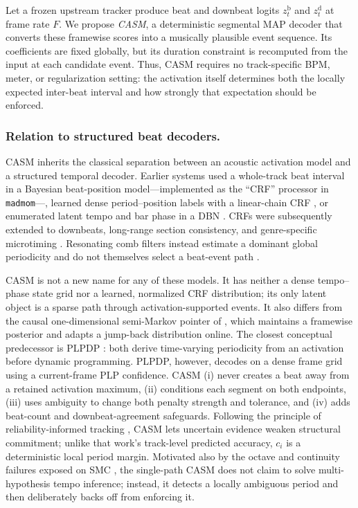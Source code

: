 \documentclass{article}
\begin{document}
Let a frozen upstream tracker produce beat and downbeat logits
$z_t^{\mathrm b}$ and $z_t^{\mathrm d}$ at frame rate $F$.  We propose
\emph{CASM}, a deterministic segmental MAP decoder that converts these
framewise scores into a musically plausible event sequence.  Its coefficients
are fixed globally, but its duration constraint is recomputed from the input at
each candidate event.  Thus, CASM requires no track-specific BPM, meter, or
regularization setting: the activation itself determines both the locally
expected inter-beat interval and how strongly that expectation should be
enforced.

\subsubsection{Relation to structured beat decoders.}
CASM inherits the classical separation between an acoustic activation model and
a structured temporal decoder.  Earlier systems used a whole-track beat
interval in a Bayesian beat-position model---implemented as the ``CRF''
processor in \texttt{madmom}---\cite{korzeniowski2014crf}, learned dense
period--position labels with a linear-chain CRF \cite{fillon2015crf}, or
enumerated latent tempo and bar phase in a DBN \cite{krebs2015dbn}.  CRFs were
subsequently extended to downbeats, long-range section consistency, and
genre-specific microtiming \cite{durand2016crfdownbeat,
fuentes2019skipchain,fuentes2019microtiming}.  Resonating comb filters instead
estimate a dominant global periodicity and do not themselves select a beat-event
path \cite{bock2015combfilter}.

CASM is not a new name for any of these models.  It has neither a dense
tempo--phase state grid nor a learned, normalized CRF distribution; its only
latent object is a sparse path through activation-supported events.  It also
differs from the causal one-dimensional semi-Markov pointer of
\cite{heydari2022semimarkov}, which maintains a framewise posterior and adapts a
jump-back distribution online.  The closest conceptual predecessor is PLPDP
\cite{chiu2023localperiodicity}: both derive time-varying periodicity from an
activation before dynamic programming.  PLPDP, however, decodes on a dense
frame grid using a current-frame PLP confidence.  CASM (i) never creates a beat
away from a retained activation maximum, (ii) conditions each segment on both
endpoints, (iii) uses ambiguity to change both penalty strength and tolerance,
and (iv) adds beat-count and downbeat-agreement safeguards.  Following the
principle of reliability-informed tracking \cite{degara2012reliability}, CASM
lets uncertain evidence weaken structural commitment; unlike that work's
track-level predicted accuracy, $c_i$ is a deterministic local period margin.
Motivated also by the octave and continuity failures exposed on SMC
\cite{ahn2026smcblindspot}, the
single-path CASM does not claim to solve multi-hypothesis tempo inference;
instead, it detects a locally ambiguous period and then deliberately backs off
from enforcing it.
\end{document}
